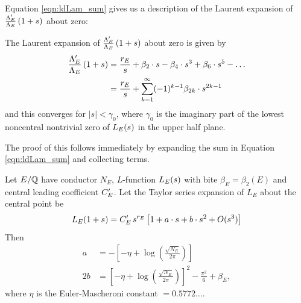 Equation \ref{eqn:ldLam_sum} gives us a description of the Laurent expansion of $\frac{\Lambda_E^{\prime}}{\Lambda_E}\left(1+s\right)$ about zero:
\begin{proposition}[GRH]\label{prop:ldLam_series_at_zero}
The Laurent expansion of $\frac{\Lambda_E^{\prime}}{\Lambda_E}\left(1+s\right)$ about zero is given by
\begin{align}
\frac{\Lambda_E^{\prime}}{\Lambda_E}\left(1+s\right) &= \frac{r_E}{s} + \beta_2\cdot s - \beta_4\cdot s^3 + \beta_6\cdot  s^5 - \ldots \\
& = \frac{r_E}{s} + \sum_{k=1}^{\infty} (-1)^{k-1}\beta_{2k}\cdot s^{2k-1}
\end{align}
and this converges for $|s|<\gamma_0$, where $\gamma_0$ is the imaginary part of the lowest noncentral nontrivial zero of $L_E(s)$ in the upper half plane.
\end{proposition}
The proof of this follows immediately by expanding the sum in Equation \ref{eqn:ldLam_sum} and collecting terms. \\

\begin{corollary}[GRH]\label{cor:ldLe_expansion}
Let $E/\mathbb{Q}$ have conductor $N_E$, $L$-function $L_E(s)$ with bite $\beta_E = \beta_2(E)$ and central leading coefficient $C_E^{\prime}$. Let the Taylor series expansion of $L_E$ about the central point be
\begin{equation}
L_E(1+s) = C_E^{\prime} \, s^{r_E}\left[1 + a\cdot s + b\cdot s^2 + O(s^3)\right]
\end{equation}
Then 
\begin{align}
a &= -\left[-\eta + \log\left(\frac{\sqrt{N_E}}{2\pi}\right)\right] \\
2b &= \left[-\eta + \log\left(\frac{\sqrt{N_E}}{2\pi}\right)\right]^2 - \frac{\pi^2}{6} + \beta_E,
\end{align}
where $\eta$ is the Euler-Mascheroni constant $= 0.5772\ldots$.
\end{corollary}

